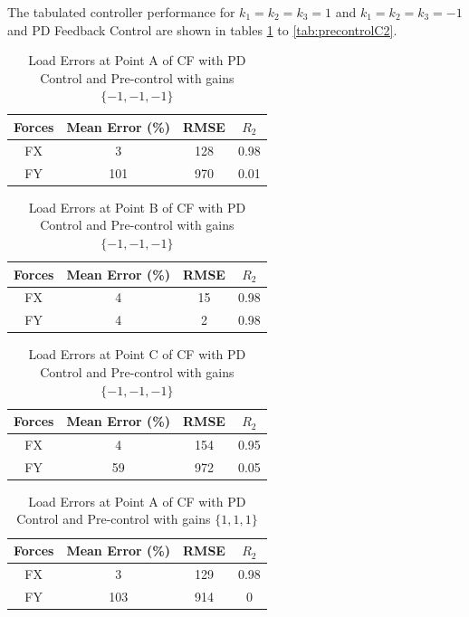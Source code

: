The tabulated controller performance for $k_1 = k_2 = k_3 = 1$ and $k_1 = k_2 = k_3 = -1$ and PD Feedback Control are shown in tables \ref{tab:precontrolA1} to \ref{tab:precontrolC2}.

\begin{table}[h]
	\centering
	\begin{tabular}{ |c|c|c|c| } 
		\hline
		Forces & Mean Error (\%) & RMSE & $R_2$\\ 
		\hline
		FX & 3&128&0.98\\ 
		FY & 101&970&0.01 \\ 
		\hline
	\end{tabular}
	\caption{Load Errors at Point A of CF with PD Control and Pre-control with gains $\{-1,-1,-1\}$}
	\label{tab:precontrolA1}
\end{table}

\begin{table}[h]
	\centering
	\begin{tabular}{ |c|c|c|c| } 
		\hline
		Forces & Mean Error (\%) & RMSE & $R_2$\\ 
		\hline
		FX & 4&15&0.98\\ 
		FY & 4&2&0.98 \\ 
		\hline
	\end{tabular}
	\caption{Load Errors at Point B of CF with PD Control and Pre-control with gains $\{-1,-1,-1\}$}
	\label{tab:precontrolB1}
\end{table}

\begin{table}[h!]
	\centering
	\begin{tabular}{ |c|c|c|c| } 
		\hline
		Forces & Mean Error (\%) & RMSE & $R_2$\\ 
		\hline
		FX & 4&154&0.95\\ 
		FY & 59&972&0.05 \\ 
		\hline
	\end{tabular}
	\caption{Load Errors at Point C of CF with PD Control and Pre-control with gains $\{-1,-1,-1\}$}
	\label{tab:precontrolC1}
\end{table}

\begin{table}[h!]
	\centering
	\begin{tabular}{ |c|c|c|c| } 
		\hline
		Forces & Mean Error (\%) & RMSE & $R_2$\\ 
		\hline
		FX & 3&129&0.98\\ 
		FY & 103&914&0 \\ 
		\hline
	\end{tabular}
	\caption{Load Errors at Point A of CF with PD Control and Pre-control with gains $\{1,1,1\}$}
	\label{tab:precontrolA2}
\end{table}

